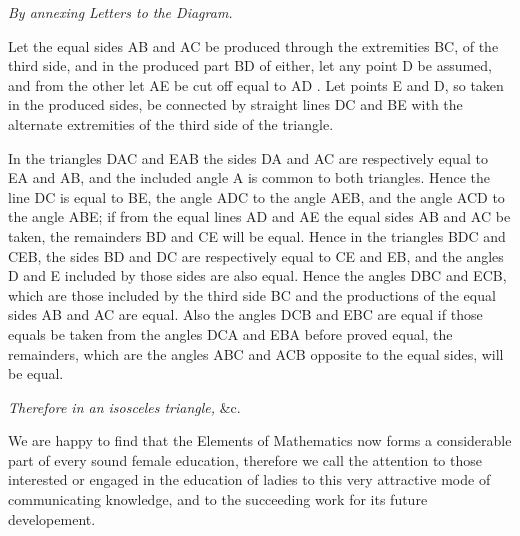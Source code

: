 \documentclass[booklanguage=english]{byrnebook}
\begin{document}
\qedNB

\begin{center}
\emph{By annexing Letters to the Diagram.}
\end{center}

Let the equal sides AB and AC be produced through the extremities BC, of the third side, and in the produced part BD of either, let any point D be assumed, and from the other let AE be cut off equal to AD . Let points E and D, so taken in the produced sides, be connected by straight lines DC and BE with the alternate extremities of the third side of the triangle.

In the triangles DAC and EAB the sides DA and AC are respectively equal to EA and AB, and the included angle A is common to both triangles. Hence  the line DC is equal to BE, the angle ADC to the angle AEB, and the angle ACD to the angle ABE; if from the equal lines AD and AE the equal sides AB and AC be taken, the remainders BD and CE will be equal. Hence in the triangles BDC and CEB, the sides BD and DC are respectively equal to CE and EB, and the angles D and E included by those sides are also equal. Hence  the angles DBC and ECB, which are those included by the third side BC and the productions of the equal sides AB and AC are equal. Also the angles DCB and EBC are equal if those equals be taken from the angles DCA and EBA before proved equal, the remainders, which are the angles ABC and ACB opposite to the equal sides, will be equal.

\emph{Therefore in an isosceles triangle,} \&c.

\qedNB


We are happy to find that the Elements of Mathematics now forms a considerable part of every sound female education, therefore we call the attention to those interested or engaged in the education of ladies to this very attractive mode of communicating knowledge, and to the succeeding work for its future developement.

\end{document}

